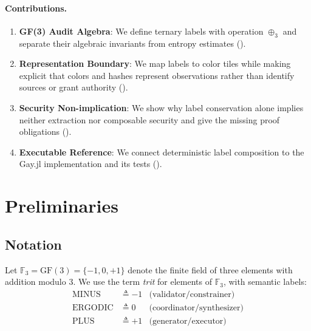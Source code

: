 \documentclass[preprint,nohyperxmp]{iacrtrans}
\begin{document}
\paragraph{Contributions.}
\begin{enumerate}
    \item \textbf{GF(3) Audit Algebra}: We define ternary labels with operation $\oplus_3$ and separate their algebraic invariants from entropy estimates ().
    
    \item \textbf{Representation Boundary}: We map labels to color tiles while making explicit that colors and hashes represent observations rather than identify sources or grant authority ().
    
    \item \textbf{Security Non-implication}: We show why label conservation alone implies neither extraction nor composable security and give the missing proof obligations ().
    
    \item \textbf{Executable Reference}: We connect deterministic label composition to the Gay.jl implementation and its tests ().
\end{enumerate}

\section{Preliminaries}
\label{sec:prelim}

\subsection{Notation}

Let $\mathbb{F}_3 = \text{GF}(3) = \{-1, 0, +1\}$ denote the finite field of three elements with addition modulo 3. We use the term \emph{trit} for elements of $\mathbb{F}_3$, with semantic labels:
\begin{align}
    \text{MINUS} &\triangleq -1 & \text{(validator/constrainer)} \\
    \text{ERGODIC} &\triangleq 0 & \text{(coordinator/synthesizer)} \\
    \text{PLUS} &\triangleq +1 & \text{(generator/executor)}
\end{align}
\end{document}
